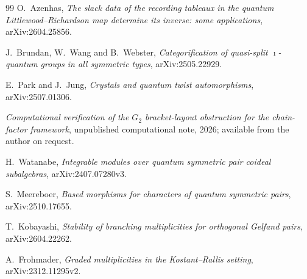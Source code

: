 \documentclass[11pt]{article}
\theoremstyle{definition}
\theoremstyle{remark}
\begin{document}
\begin{thebibliography}{99}
O.~Azenhas,
\emph{The slack data of the recording tableaux in the quantum Littlewood--Richardson map
determine its inverse: some applications},
arXiv:2604.25856.

J.~Brundan, W.~Wang and B.~Webster,
\emph{Categorification of quasi-split $\imath$-quantum groups in all symmetric types},
arXiv:2505.22929.

E.~Park and J.~Jung,
\emph{Crystals and quantum twist automorphisms},
arXiv:2507.01306.

\emph{Computational verification of the $G_2$ bracket-layout obstruction for
the chain-factor framework}, unpublished computational note, 2026; available
from the author on request.

H.~Watanabe,
\emph{Integrable modules over quantum symmetric pair coideal subalgebras},
arXiv:2407.07280v3.

S.~Meereboer,
\emph{Based morphisms for characters of quantum symmetric pairs},
arXiv:2510.17655.

T.~Kobayashi,
\emph{Stability of branching multiplicities for orthogonal Gelfand pairs},
arXiv:2604.22262.

A.~Frohmader,
\emph{Graded multiplicities in the Kostant--Rallis setting},
arXiv:2312.11295v2.

\end{thebibliography}
\end{document}
